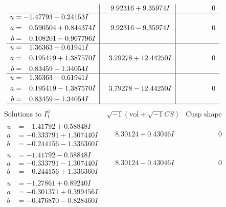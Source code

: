 \documentclass[1p]{elsarticle_modified}
\theoremstyle{definition}
\newcommand{\I}{\sqrt{-1}}
\begin{document}
$$\begin{array}{c|c|c}
 & \phantom{-}9.92316 + 9.35974 I & \phantom{-0.000000 } 0 \\ \hline\begin{aligned}
u &= -1.47793 - 0.24153 I \\
a &= \phantom{-}0.590504 + 0.844374 I \\
b &= \phantom{-}0.108201 - 0.967796 I\end{aligned}
 & \phantom{-}9.92316 - 9.35974 I & \phantom{-0.000000 } 0 \\ \hline\begin{aligned}
u &= \phantom{-}1.36363 + 0.61941 I \\
a &= \phantom{-}0.195419 + 1.387570 I \\
b &= \phantom{-}0.83459 - 1.34054 I\end{aligned}
 & \phantom{-}3.79278 + 12.44250 I & \phantom{-0.000000 } 0 \\ \hline\begin{aligned}
u &= \phantom{-}1.36363 - 0.61941 I \\
a &= \phantom{-}0.195419 - 1.387570 I \\
b &= \phantom{-}0.83459 + 1.34054 I\end{aligned}
 & \phantom{-}3.79278 - 12.44250 I & \phantom{-0.000000 } 0\\
 \hline 
 \end{array}$$\newpage$$\begin{array}{c|c|c}  
\text{Solutions to }I^u_{1}& \I (\text{vol} + \sqrt{-1}CS) & \text{Cusp shape}\\
 \hline 
\begin{aligned}
u &= -1.41792 + 0.58848 I \\
a &= -0.333791 + 1.307440 I \\
b &= -0.244156 - 1.336360 I\end{aligned}
 & \phantom{-}8.30124 + 0.43046 I & \phantom{-0.000000 } 0 \\ \hline\begin{aligned}
u &= -1.41792 - 0.58848 I \\
a &= -0.333791 - 1.307440 I \\
b &= -0.244156 + 1.336360 I\end{aligned}
 & \phantom{-}8.30124 - 0.43046 I & \phantom{-0.000000 } 0 \\ \hline\begin{aligned}
u &= -1.27861 + 0.89240 I \\
a &= -0.301371 + 0.399456 I \\
b &= -0.476870 - 0.828460 I\end{aligned}

\end{array}$$
\end{document}
